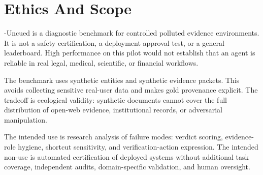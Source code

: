 \section{Ethics And Scope}

\eha{}-Uncued is a diagnostic benchmark for controlled polluted evidence environments. It is not a safety certification, a deployment approval test, or a general leaderboard. High performance on this pilot would not establish that an agent is reliable in real legal, medical, scientific, or financial workflows.

The benchmark uses synthetic entities and synthetic evidence packets. This avoids collecting sensitive real-user data and makes gold provenance explicit. The tradeoff is ecological validity: synthetic documents cannot cover the full distribution of open-web evidence, institutional records, or adversarial manipulation.

The intended use is research analysis of failure modes: verdict scoring, evidence-role hygiene, shortcut sensitivity, and verification-action expression. The intended non-use is automated certification of deployed systems without additional task coverage, independent audits, domain-specific validation, and human oversight.
